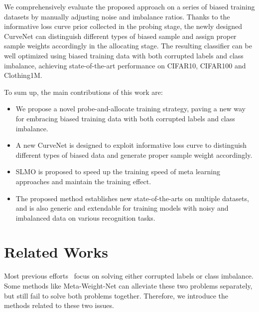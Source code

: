\documentclass[letterpaper]{article} %
\begin{document}
We comprehensively evaluate the proposed approach on a series of biased training datasets by manually adjusting noise and imbalance ratios. Thanks to the informative loss curve prior collected in the probing stage, the newly designed CurveNet can distinguish different types of biased sample and assign proper sample weights accordingly in the allocating stage. The resulting classifier can be well optimized using biased training data with both corrupted labels and class imbalance, achieving state-of-the-art performance on CIFAR10, CIFAR100 and Clothing1M.

To sum up, the main contributions of this work are:
\begin{itemize}
\item We propose a novel probe-and-allocate training strategy, paving a new way for embracing biased training data with both corrupted labels and class imbalance.
\item A new CurveNet is designed to exploit informative loss curve to distinguish different types of biased data and generate proper sample weight accordingly. 
\item SLMO is proposed to speed up the training speed of meta learning approaches and maintain the training effect. 
\item The proposed method establishes new state-of-the-arts on multiple datasets, and is also generic and extendable for training models with noisy and imbalanced data on various recognition tasks. 
\end{itemize}

\section{Related Works}

Most previous efforts~\cite{kumar2010self,pi2016self,hendrycks2018using,ma2018dimensionality} focus on solving either corrupted labels or class imbalance.
Some methods like Meta-Weight-Net \cite{shu2019meta} can alleviate these two problems separately, but still fail to solve both problems together.
Therefore, we introduce the methods related to these two issues.
\end{document}
